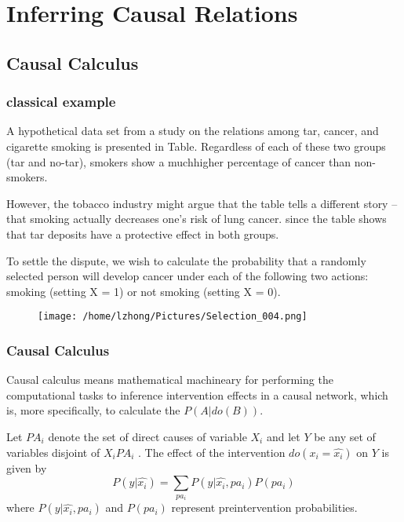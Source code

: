 \documentclass{beamer}
\begin{document}
\section{Inferring Causal Relations}
\subsection{Causal Calculus}

\begin{frame}
\frametitle{classical example}


\footnotesize A hypothetical data set from a study on the
relations among tar, cancer, and cigarette smoking is
presented in Table. Regardless of each of
these two groups (tar and no-tar), smokers show a muchhigher percentage of cancer than non-smokers.


\footnotesize However, the tobacco industry
might argue that the table tells a different story – that
smoking actually decreases one’s risk of lung cancer. since the table shows that tar deposits have a protective effect in both groups.

\footnotesize To settle the dispute, we wish to calculate the probability
that a randomly selected person will develop cancer under
each of the following two actions: smoking (setting X = 1)
or not smoking (setting X = 0).

\begin{figure}
\texttt{[image: /home/lzhong/Pictures/Selection\_004.png]}
\end{figure}



\end{frame}

\begin{frame}
\frametitle{Causal Calculus}
\small Causal calculus means mathematical machineary for performing the computational tasks
to inference intervention effects in a causal network, which is, more specifically, 
to calculate the $P(A|do(B))$.
\begin{theorem}
Let $PA_i$ denote the set of direct causes of variable $X_i$ and
let $Y$ be any set of variables disjoint of ${X_i PA_i}$ . The
effect of the intervention $do(x_i = \hat{x_i})$ on $Y$ is given by
$$
P(y|\hat{x_i}) = \sum_{pa_i} P(y|\hat{x_i},pa_i)P(pa_i)
$$
where $P(y|\hat{x_i}, pa_i)$ and $P(pa_i)$ represent preintervention
probabilities.
\end{theorem}

\end{frame}
\end{document}
